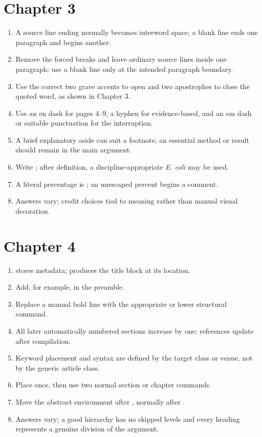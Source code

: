 \section*{Chapter 3}
\begin{enumerate}[label=3.\arabic*,leftmargin=2.4em,itemsep=0.45em]
  \item A source line ending normally becomes interword space; a blank line ends
        one paragraph and begins another.
  \item Remove the forced breaks and leave ordinary source lines inside one
        paragraph; use a blank line only at the intended paragraph boundary.
  \item Use the correct two grave accents to open and two apostrophes to close
        the quoted word, as shown in Chapter 3.
  \item Use an en dash for pages 4--9, a hyphen for evidence-based, and an em
        dash or suitable punctuation for the interruption.
  \item A brief explanatory aside can suit a footnote; an essential method or
        result should remain in the main argument.
  \item Write ; after definition, a
        discipline-appropriate \textit{E. coli} may be used.
  \item A literal percentage is \code{50\textbackslash\%}; an unescaped percent
        begins a comment.
  \item Answers vary; credit choices tied to meaning rather than manual visual
        decoration.
\end{enumerate}

\section*{Chapter 4}
\begin{enumerate}[label=4.\arabic*,leftmargin=2.4em,itemsep=0.45em]
  \item {} stores metadata;  produces the title block at
        its location.
  \item Add, for example,  in the preamble.
  \item Replace a manual bold line with the appropriate  or lower
        structural command.
  \item All later automatically numbered sections increase by one; references
        update after compilation.
  \item Keyword placement and syntax are defined by the target class or venue,
        not by the generic article class.
  \item Place  once, then use two normal section or chapter commands.
  \item Move the abstract environment after
        , normally after .
  \item Answers vary; a good hierarchy has no skipped levels and every heading
        represents a genuine division of the argument.
\end{enumerate}

